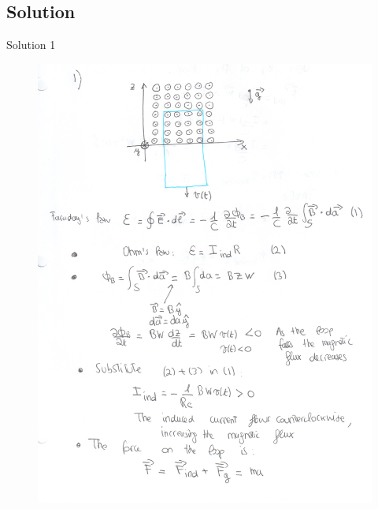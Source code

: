\documentclass[solutions]{esg8022pset}
\begin{document}
\subsection{Solution}
  Solution 1
  \begin{figure}[H]
    \centering
    \includegraphics{ps9_1a}
  \end{figure}
\end{document}
